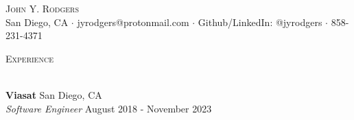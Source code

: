 \documentclass[a4paper]{article}
\newcommand{\lineunder} {
    \vspace*{-8pt} \\
    \hspace*{-18pt} \hrulefill \\
}
\newcommand{\header} [1] {
    {\hspace*{-18pt}\vspace*{6pt} \textsc{#1}}
    \vspace*{-6pt} \lineunder
}
\begin{document}
\vspace*{-40pt}



\vspace*{-10pt}
\begin{center}
	{\Huge \scshape {John Y. Rodgers}}\\
	San Diego, CA $\cdot$ jyrodgers@protonmail.com $\cdot$ Github/LinkedIn: @jyrodgers $\cdot$ 858-231-4371 \\
\end{center}

\header{Experience}
\vspace{1mm}

\textbf{Viasat} \hfill San Diego, CA\\
\textit{Software Engineer} \hfill August 2018 - November 2023\\
\vspace{-1mm}
\end{document}
